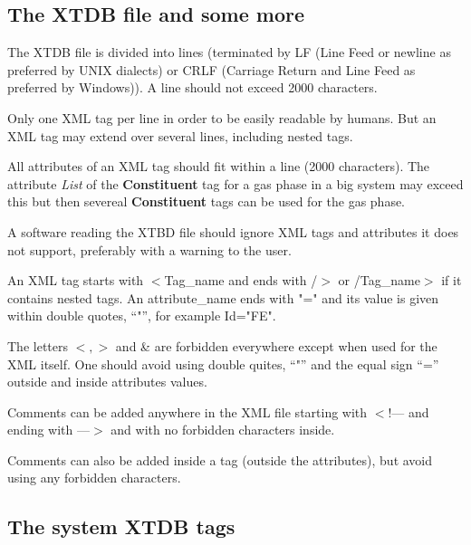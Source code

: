 \documentclass{article}
\begin{document}
\subsection{The XTDB file and some more}\label{sec:first}

The XTDB file is divided into lines (terminated by LF (Line Feed or
newline as preferred by UNIX dialects) or CRLF (Carriage Return and
Line Feed as preferred by Windows)).  A line should not exceed 2000
characters.

Only one XML tag per line in order to be easily readable by humans.
But an XML tag may extend over several lines, including nested tags.

All attributes of an XML tag should fit within a line (2000
characters).  The attribute {\em List} of the {\bf Constituent} tag
for a gas phase in a big system may exceed this but then severeal {\bf
  Constituent} tags can be used for the gas phase.

A software reading the XTBD file should ignore XML tags and attributes
it does not support, preferably with a warning to the user.

An XML tag starts with $<$Tag\_name and ends with /$>$ or
/Tag\_name$>$ if it contains nested tags.  An attribute\_name ends
with "=" and its value is given within double quotes, ``"'', for
example Id="FE".

The letters $<, >$ and \& are forbidden everywhere except when used
for the XML itself.  One should avoid using double quites, ``"'' and
the equal sign ``='' outside and inside attributes values.

Comments can be added anywhere in the XML file starting with $<$!---
and ending with ---$>$ and with no forbidden characters inside.

Comments can also be added inside a tag (outside the attributes), but
avoid using any forbidden characters.

\newpage

\subsection{The system XTDB tags}
\end{document}
